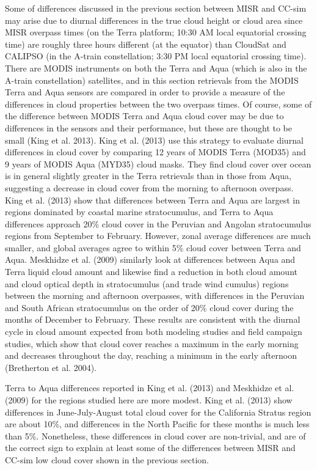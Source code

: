 Some of differences discussed in the previous section between MISR and
CC-sim may arise due to diurnal differences in the true cloud height or
cloud area since MISR overpass times (on the Terra platform; 10:30 AM
local equatorial crossing time) are roughly three hours different (at
the equator) than CloudSat and CALIPSO (in the A-train constellation;
3:30 PM local equatorial crossing time). There are MODIS instruments on
both the Terra and Aqua (which is also in the A-train constellation)
satellites, and in this section retrievals from the MODIS Terra and Aqua
sensors are compared in order to provide a measure of the differences in
cloud properties between the two overpass times. Of course, some of the
difference between MODIS Terra and Aqua cloud cover may be due to
differences in the sensors and their performance, but these are thought
to be small (King et al. 2013). King et al. (2013) use this strategy to
evaluate diurnal differences in cloud cover by comparing 12 years of
MODIS Terra (MOD35) and 9 years of MODIS Aqua (MYD35) cloud masks. They
find cloud cover over ocean is in general slightly greater in the Terra
retrievals than in those from Aqua, suggesting a decrease in cloud cover
from the morning to afternoon overpass. King et al. (2013) show that
differences between Terra and Aqua are largest in regions dominated by
coastal marine stratocumulus, and Terra to Aqua differences approach
20\% cloud cover in the Peruvian and Angolan stratocumulus regions from
September to February. However, zonal average differences are much
smaller, and global averages agree to within 5\% cloud cover between
Terra and Aqua. Meskhidze et al. (2009) similarly look at differences
between Aqua and Terra liquid cloud amount and likewise find a reduction
in both cloud amount and cloud optical depth in stratocumulus (and trade
wind cumulus) regions between the morning and afternoon overpasses, with
differences in the Peruvian and South African stratocumulus on the order
of 20\% cloud cover during the months of December to February. These
results are consistent with the diurnal cycle in cloud amount expected
from both modeling studies and field campaign studies, which show that
cloud cover reaches a maximum in the early morning and decreases
throughout the day, reaching a minimum in the early afternoon
(Bretherton et al. 2004).

Terra to Aqua differences reported in King et al. (2013) and Meskhidze
et al. (2009) for the regions studied here are more modest. King et al.
(2013) show differences in June-July-August total cloud cover for the
California Stratus region are about 10\%, and differences in the North
Pacific for these months is much less than 5\%. Nonetheless, these
differences in cloud cover are non-trivial, and are of the correct sign
to explain at least some of the differences between MISR and CC-sim low
cloud cover shown in the previous section.

